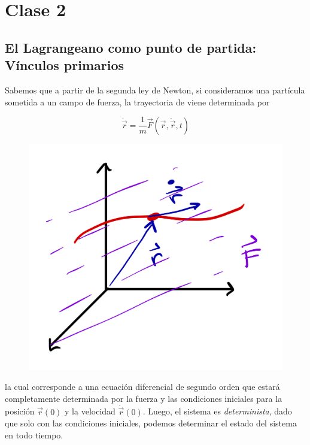 \section{Clase 2}

\subsection{El Lagrangeano como punto de partida: Vínculos primarios}
Sabemos que a partir de la segunda ley de Newton, si consideramos una partícula sometida a un campo de fuerza, la trayectoria de viene determinada por



\begin{equation}
  \ddot{\vec{r}}=\frac{1}{m}\vec{F}(\vec{r},\dot{\vec{r}},t)
\end{equation}

\begin{figure}
\includegraphics[width=1.0\linewidth]{2-particula} 
\end{figure}

la cual corresponde a una ecuación diferencial de segundo orden que estará completamente determinada por la fuerza y las condiciones iniciales para la posición $\vec{r}(0)$ y la velocidad $\dot{\vec{r}}(0)$. Luego, el sistema es \textit{determinista}, dado que solo con las condiciones iniciales, podemos determinar el estado del sistema en todo tiempo.



